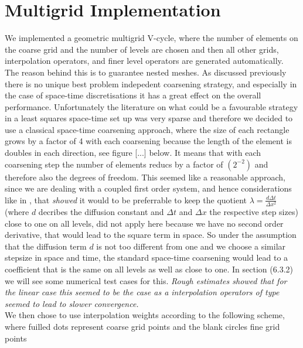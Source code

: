 \documentclass[../draft_1.tex]{subfiles}
\begin{document}
\section{Multigrid Implementation}
We implemented a geometric multigrid V-cycle, where the number of elements on the coarse grid and the number of levels are chosen and then all other grids, interpolation operators, and finer level operators are generated automatically. The reason behind this is to guarantee nested meshes. As discussed previously there is no unique best problem indepedent coarsening strategy, and especially in the case of space-time discretisations it has a great effect on the overall performance. Unfortunately the literature on what could be a favourable strategy in a least squares space-time set up was very sparse and therefore we decided to use a classical space-time coarsening approach, where the size of each rectangle grows by a factor of 4 with each coarsening because the length of the element is doubles in each direction, see figure [...] below. It means that with each coarsening step the number of elements reducs by a factor of $(2^{-2})$ and therefore also the degrees of freedom. This seemed like a reasonable approach, since we are dealing with a coupled first order system, and hence considerations like in \cite{gander2016analysis}, that \textit{showed} it would to be preferrable to keep the quotient $\lambda = \frac{d \Delta t}{\Delta x^2}$ (where $d$ decribes the diffusion constant and $\Delta t$ and $\Delta x$ the respective step sizes) close to one on all levels, did not apply here because we have no second order derivative, that would lead to the square term in space. So under the assumption that the diffusion term $d$ is not too different from one and we choose a similar stepsize in space and time, the standard space-time coarsening would lead to a coefficient that is the same on all levels as well as close to one. In section (6.3.2) we will see some numerical test cases for this. \textit{Rough estimates showed that for the linear case this seemed to be the case as a interpolation operators of type \cite{gander2016analysis} seemed to lead to slower convergence.} 
\smallskip
\\
We then chose to use interpolation weights according to the following scheme, where fuilled dots represent coarse grid points and the blank circles fine grid points \\
\end{document}
